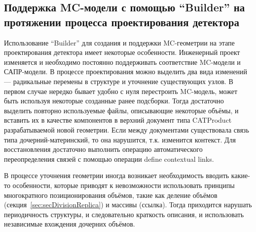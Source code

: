 
\subsection{Поддержка MC-модели с помощью ``Builder'' на протяжении процесса проектирования детектора}\label{sec:DesignProcess}

Использование ``Builder'' для создания и поддержки MC-геометрии на этапе проектирования детектора имеет некоторые особенности. Инженерный проект изменяется и необходимо постоянно поддерживать соответствие MC-модели и САПР-модели. В процессе проектирования можно выделить два вида изменений --- радикальные перемены в структуре и уточнение существующих узлов. В первом случае нередко бывает удобно с нуля перестроить MC-модель, может быть используя некоторые созданные ранее подсборки. Тогда достаточно выделить повторно используемые файлы, описывающие некоторые объёмы, и вставить их в качестве компонентов в верхний документ типа CATProduct разрабатываемой новой геометрии. Если между документами существовала связь типа дочерний-материнский, то она нарушится, т.к. изменится контекст. Для восстановления достаточно выполнить операцию автоматического переопределения связей с помощью операции define contextual links.

В процессе уточнения геометрии иногда возникает необходимость вводить какие-то особенности, которые приводят к невозможности использовать принципы многократного позиционирования объёмов, такие как деление объёмов (секция~\ref{sec:secDivisionReplica}) и массивы (\todo ссылка). Тогда приходится нарушать периодичность структуры, и следовательно краткость описания, и использовать независимые вхождения дочерних объёмов. 

